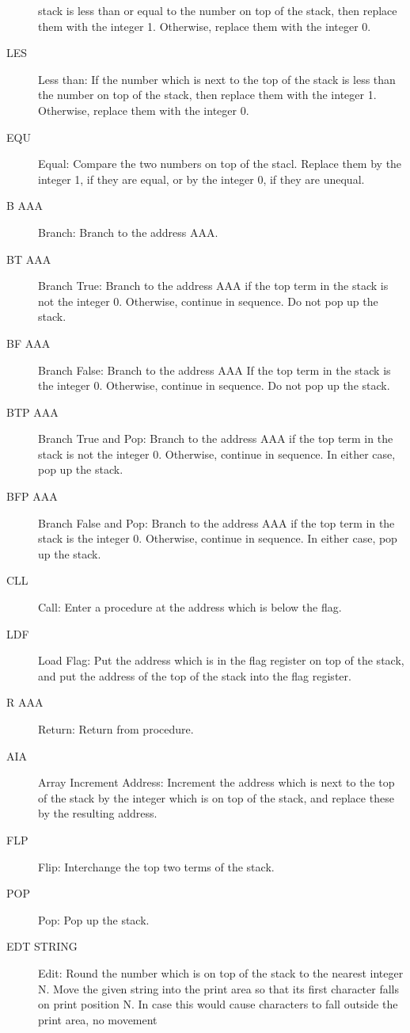 \documentclass[twocolumn]{article}
\begin{document}
\begin{description}
stack is less than or equal to the number on top of the stack, then replace
them with the integer 1. Otherwise, replace them with the integer 0.
\item[LES] Less than: If the number which is next to the top of the stack is
less than the number on top of the stack, then replace them with the integer
1. Otherwise, replace them with the integer 0.
\item[EQU] Equal: Compare the two numbers on top of the stacl.
Replace them by the integer 1, if they are equal, or by the integer 0, if 
they are unequal.
\item[B   AAA] Branch: Branch to the address AAA.
\item[BT  AAA] Branch True: Branch to the address AAA if the top term in
the stack is not the integer 0. Otherwise, continue in sequence.
Do not pop up the stack.
\item[BF  AAA] Branch False: Branch to the address AAA If the top term in
the stack is the integer 0. Otherwise, continue in sequence.
Do not pop up the stack.
\item[BTP AAA] Branch True and Pop: Branch to the address AAA if the top
term in the stack is not the integer 0. Otherwise, continue in sequence.
In either case, pop up the stack.
\item[BFP AAA] Branch False and Pop: Branch to the address AAA if the
top term in the stack is the integer 0.
Otherwise, continue in sequence.
In either case, pop up the stack.
\item[CLL] Call: Enter a procedure at the address which is below the flag.
\item[LDF] Load Flag: Put the address which is in the flag register on top
of the stack, and put the address of the top of the stack into the flag register.
\item[R   AAA] Return: Return from procedure.
\item[AIA] Array Increment Address: Increment the address which is next
to the top of the stack by the integer which is on top of the stack, and
replace these by the resulting address.
\item[FLP] Flip: Interchange the top two terms of the stack.
\item[POP] Pop: Pop up the stack.
\item[EDT STRING] Edit: Round the number which is on top of the stack to the
nearest integer N. Move the given string into the print area so that its first
character falls on print position N.
In case this would cause characters to fall outside the print area, no movement

\end{description}
\end{document}
